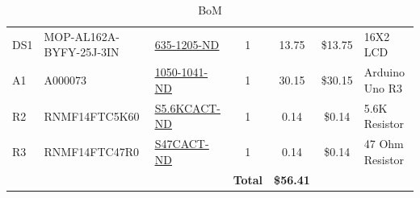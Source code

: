 \documentclass{article}
\begin{document}
\begin{landscape}
\begin{table}[h!]
\begin{tabular}{l|l|l|c|c|c|l}
DS1&MOP-AL162A-BYFY-25J-3IN          & \href{https://www.digikey.ca/en/products/detail/matrix-orbital/MOP-AL162A-BYFY-25J-3IN/9602838}{\underline{635-1205-ND}}          & 1                 & 13.75               & \$13.75                 & 16X2 LCD                  \\
A1&A000073                           & \href{https://www.digikey.ca/en/products/detail/arduino/A000073/3476357}{\underline{1050-1041-ND}}                                & 1                 & 30.15               & \$30.15                 & Arduino Uno R3            \\
R2&RNMF14FTC5K60                    & \href{https://www.digikey.ca/en/products/detail/stackpole-electronics-inc/RNMF14FTC5K60/2617364}{\underline{S5.6KCACT-ND}}         & 1                 & 0.14                & \$0.14                  & 5.6K Resistor               \\
R3&RNMF14FTC47R0                     & \href{https://www.digikey.ca/en/products/detail/stackpole-electronics-inc/RNMF14FTC47R0/2617352}{\underline{S47CACT-ND}}          & 1                 & 0.14                & \$0.14                  & 47 Ohm Resistor          \\

    \hline
    &&&\textbf{Total}&\textbf{\$56.41}&
    \end{tabular}
    \caption{BoM}
    \label{tab:bom}
\end{table}


\end{landscape}
\end{document}
